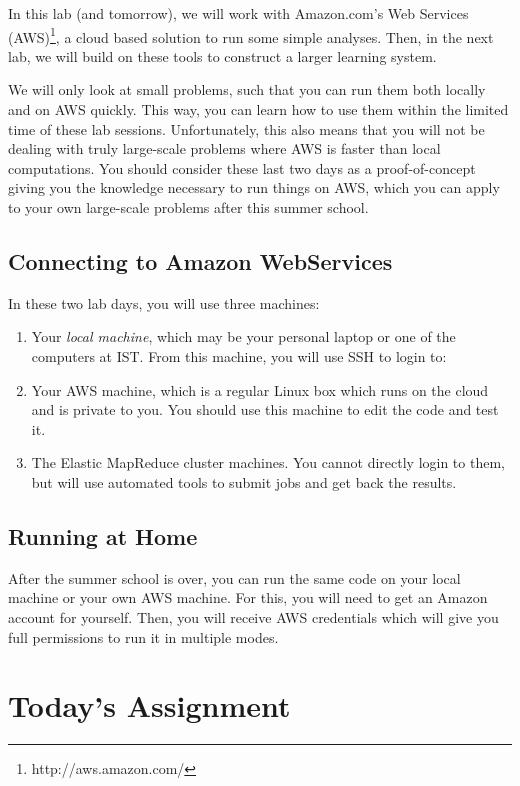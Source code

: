 In this lab (and tomorrow), we will work with Amazon.com's Web Services
(AWS)\footnote{http://aws.amazon.com/}, a cloud based solution to run some
simple analyses. Then, in the next lab, we will build on these
tools to construct a larger learning system.

We will only look at small problems, such that you can run them both locally and on AWS quickly. This way, you can learn how to use them within the limited time of these lab sessions. Unfortunately, this also means that you will not be dealing with truly large-scale problems where AWS is faster than local computations. You should consider these last two days as a proof-of-concept giving you the knowledge necessary to run things on AWS, which you can apply to your own large-scale problems after this summer school.

\subsection*{Connecting to Amazon WebServices}

In these two lab days, you will use three machines:

\begin{enumerate}
\item Your \emph{local machine}, which may be your personal laptop or one of
the computers at IST. From this machine, you will use SSH to login to:
\item Your AWS machine, which is a regular Linux box which runs on the cloud
and is private to you. You should use this machine to edit the code and test
it.
\item The Elastic MapReduce cluster machines. You cannot directly login to
them, but will use automated tools to submit jobs and get back the results.
\end{enumerate}

\subsection*{Running at Home}

After the summer school is over, you can run the same code on your local
machine or your own AWS machine. For this, you will need to get an Amazon
account for yourself. Then, you will receive AWS credentials which will give
you full permissions to run it in multiple modes.

\section*{Today's Assignment}


